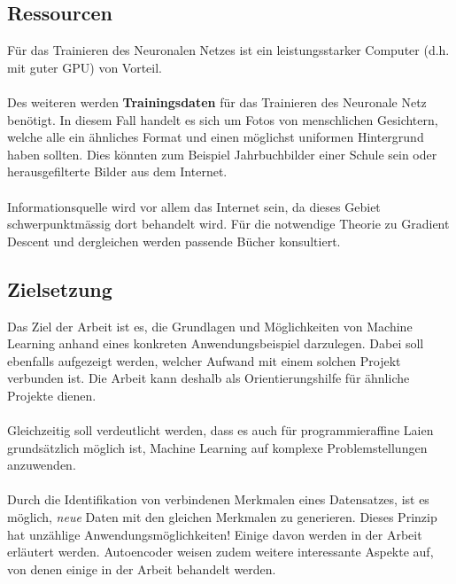 \documentclass[12pt, a4paper]{article}
\begin{document}
\subsection*{Ressourcen}
Für das Trainieren des Neuronalen Netzes ist ein leistungsstarker Computer (d.h. mit guter GPU) von Vorteil.
\\\\
Des weiteren werden \textbf{Trainingsdaten} für das Trainieren des Neuronale Netz benötigt. In diesem Fall handelt es sich um Fotos von menschlichen Gesichtern, welche alle ein ähnliches Format und einen möglichst uniformen Hintergrund haben sollten.
Dies könnten zum Beispiel Jahrbuchbilder einer Schule sein oder herausgefilterte Bilder aus dem Internet.
\\\\
Informationsquelle wird vor allem das Internet sein, da dieses Gebiet schwerpunktmässig dort behandelt wird. Für die notwendige Theorie zu Gradient Descent und dergleichen werden passende Bücher konsultiert.

\pagebreak

\subsection*{Zielsetzung}
Das Ziel der Arbeit ist es, die Grundlagen und Möglichkeiten von Machine Learning anhand eines konkreten Anwendungsbeispiel darzulegen.
Dabei soll ebenfalls aufgezeigt werden, welcher Aufwand mit einem solchen Projekt verbunden ist.
Die Arbeit kann deshalb als Orientierungshilfe für ähnliche Projekte dienen.\\\\
Gleichzeitig soll verdeutlicht werden, dass es auch für programmieraffine Laien grundsätzlich möglich ist, Machine Learning auf komplexe Problemstellungen anzuwenden.
\\\\
Durch die Identifikation von verbindenen Merkmalen eines Datensatzes, ist es möglich, \textit{neue} Daten mit den gleichen Merkmalen zu generieren.
Dieses Prinzip hat unzählige Anwendungsmöglichkeiten! Einige davon werden in der Arbeit erläutert werden.
Autoencoder weisen zudem weitere interessante Aspekte auf, von denen einige in der Arbeit behandelt werden.
\end{document}
